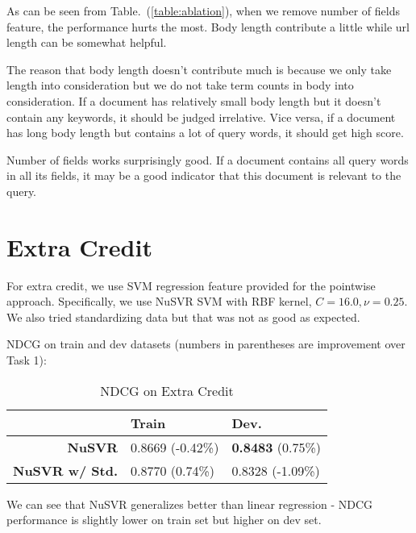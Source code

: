 \documentclass{article}
\begin{document}
As can be seen from Table.~(\ref{table:ablation}), when we remove number of fields feature, the performance hurts the most. Body length contribute a little while url length can be somewhat helpful.

The reason that body length doesn't contribute much is because we only take length into consideration but we do not take term counts in body into consideration. If a document has relatively small body length but it doesn't contain any keywords, it should be judged irrelative. Vice versa, if a document has long body length but contains a lot of query words, it should get high score.

Number of fields works surprisingly good. If a document contains all query words in all its fields, it may be a good indicator that this document is relevant to the query.

\section{Extra Credit}

For extra credit, we use SVM regression feature provided for the pointwise approach.
Specifically, we use NuSVR SVM with RBF kernel, $C=16.0,\nu=0.25$. We also tried standardizing data but that was not as good as expected.

NDCG on train and dev datasets (numbers in parentheses are improvement over Task 1):

\begin{table}[!htb]
    \centering
    \begin{tabular}{| r | l | l |}
        \hline
        & \textbf{Train} & \textbf {Dev.} \\
        \hline
        \textbf{NuSVR} & 0.8669 (-0.42\%) & \textbf{0.8483} (0.75\%) \\
        \hline
        \textbf{NuSVR w/ Std.} & 0.8770 (0.74\%) & 0.8328 (-1.09\%) \\
        \hline
    \end{tabular}
    \caption{NDCG on Extra Credit}
\end{table}

We can see that NuSVR generalizes better than linear regression - NDCG performance is slightly lower on train set but higher on dev set.
\end{document}

